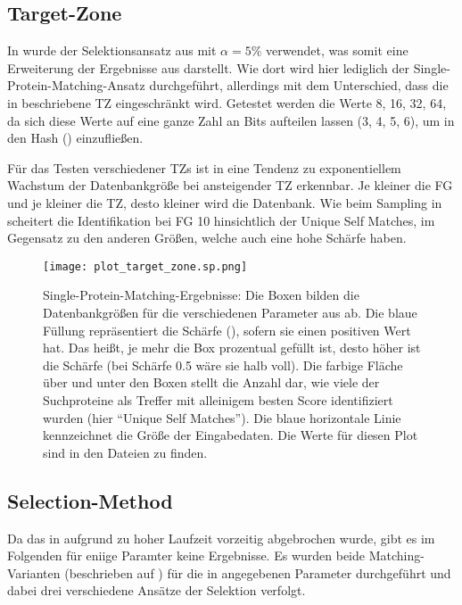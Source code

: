     \subsection{Target-Zone} %
        \label{sub:target_results}
        In  wurde der Selektionsansatz aus  mit $\alpha=5\%$ verwendet, was somit eine Erweiterung der Ergebnisse aus  darstellt. Wie dort wird hier lediglich der Single-Protein-Matching-Ansatz durchgeführt, allerdings mit dem Unterschied, dass die in  beschriebene \acl{TZ} eingeschränkt wird. Getestet werden die Werte 8, 16, 32, 64, da sich diese Werte auf eine ganze Zahl an Bits aufteilen lassen (3, 4, 5, 6), um in den Hash () einzufließen.

        Für das Testen verschiedener \acp{TZ} ist in  eine Tendenz zu exponentiellem Wachstum der Datenbankgröße bei ansteigender \ac{TZ} erkennbar. Je kleiner die \acl{FG} und je kleiner die \ac{TZ}, desto kleiner wird die Datenbank. Wie beim Sampling in  scheitert die Identifikation bei \ac{FG} 10 hinsichtlich der Unique Self Matches, im Gegensatz zu den anderen Größen, welche auch eine hohe Schärfe haben.

        \begin{figure}[H]
            \centering
            \texttt{[image: plot\_target\_zone.sp.png]}
            \caption[Single-Protein-Matching ]{Single-Protein-Matching-Ergebnisse: Die Boxen bilden die Datenbankgrößen für die verschiedenen Parameter aus  ab. Die blaue Füllung repräsentiert die Schärfe (), sofern sie einen positiven Wert hat. Das heißt, je mehr die Box prozentual gefüllt ist, desto höher ist die Schärfe (bei Schärfe 0.5 wäre sie halb voll). Die farbige Fläche über und unter den Boxen stellt die Anzahl dar, wie viele der Suchproteine als Treffer mit alleinigem besten Score identifiziert wurden (hier ``Unique Self Matches''). Die blaue horizontale Linie kennzeichnet die Größe der Eingabedaten. Die Werte für diesen Plot sind in den Dateien  zu finden.}
            \label{fig:target_zone.sp}
        \end{figure}

    \subsection{Selection-Method} %
        \label{sub:selection_results}
        Da das  in  aufgrund zu hoher Laufzeit vorzeitig abgebrochen wurde, gibt es im Folgenden für eniige Paramter keine Ergebnisse. Es wurden beide Matching-Varianten (beschrieben auf ) für die in  angegebenen Parameter durchgeführt und dabei drei verschiedene Ansätze der Selektion verfolgt.

